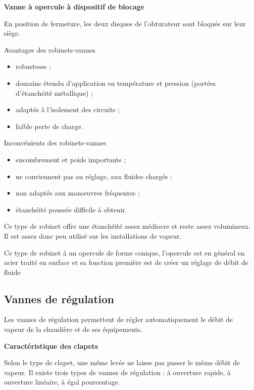 \vspace{0.3cm}
\textbf{Vanne à opercule à dispositif de blocage}
\vspace{0.3cm}

En position de fermeture, les deux disques de l’obturateur sont bloqués sur leur siège.


Avantages des robinets-vannes
\begin{itemize}
\item  robustesse ;
\item  domaine étendu d’application en température et pression (portées d’étanchéité métallique) ;
\item  adaptés à l’isolement des circuits ;
\item  faible perte de charge.

\end{itemize}

Inconvénients des robinets-vannes
\begin{itemize}

\item  encombrement et poids importants ;
\item  ne conviennent pas au réglage, aux fluides chargés ;
\item  non adaptés aux manœuvres fréquentes ;
\item  étanchéité poussée difficile à obtenir. 
 \end{itemize}


Ce type de robinet offre une étanchéité assez médiocre et reste assez volumineux. Il est assez donc peu utilisé sur les installations de vapeur.
\vspace{0.3cm}

Ce type de robinet à un opercule de forme conique, l’opercule est en général en acier traité en surface et sa fonction première est de créer un réglage de débit de fluide 


\subsection{Vannes de régulation}

Les vannes de régulation permettent de régler automatiquement le débit de vapeur de la chaudière et de ses équipements.


\vspace{0.3cm}
\textbf{Caractéristique des clapets}
\vspace{0.3cm}


Selon le type de clapet, une même levée ne laisse pas passer le même débit de vapeur. Il existe trois types de vannes de régulation : à ouverture rapide, à ouverture linéaire, à égal pourcentage.


